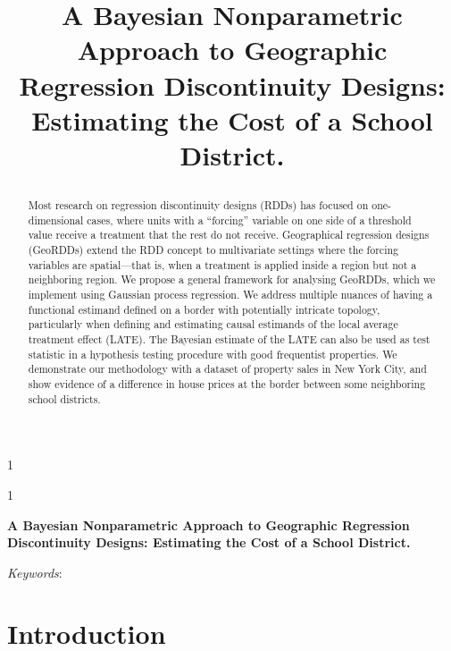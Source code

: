 \documentclass[12pt]{article}
\newcommand{\blind}{1}
\newcommand{\georddtitle}{
    A Bayesian Nonparametric Approach to Geographic Regression Discontinuity Designs:
    Estimating the Cost of a School District.
}
\begin{document}


\blind
{
\title{
    \Large
    \bf
    \georddtitle
}
\author{\georddauthor}
\maketitle
} \fi

\blind
{
  \bigskip
  \bigskip
  \bigskip
  \begin{center}
    {\LARGE\bf \georddtitle}
\end{center}
  \medskip
} \fi
\begin{abstract}
    Most research on regression discontinuity designs (RDDs) has focused on one-dimensional cases, where units with a ``forcing'' variable on one side of a threshold value receive a treatment that the rest do not receive.
    Geographical regression designs (GeoRDDs) extend the RDD concept to multivariate settings where the forcing variables are spatial---that is, when a treatment is applied inside a region but not a neighboring region.
    We propose a general framework for analysing GeoRDDs, which we implement using Gaussian process regression.
    We address multiple nuances of having a functional estimand defined on a border with potentially intricate topology, particularly when defining and estimating causal estimands of the local average treatment effect (LATE).
    The Bayesian estimate of the LATE can also be used as test statistic
    in a hypothesis testing procedure with good frequentist properties.
    We demonstrate our methodology with a dataset of property sales in New York City,
    and show evidence of a difference in house prices at the border between some neighboring school districts.
\end{abstract}

\noindent%
{\it Keywords}: \georddkeywords
\vfill
\newpage

\section{Introduction}\label{introduction}
\end{document}
